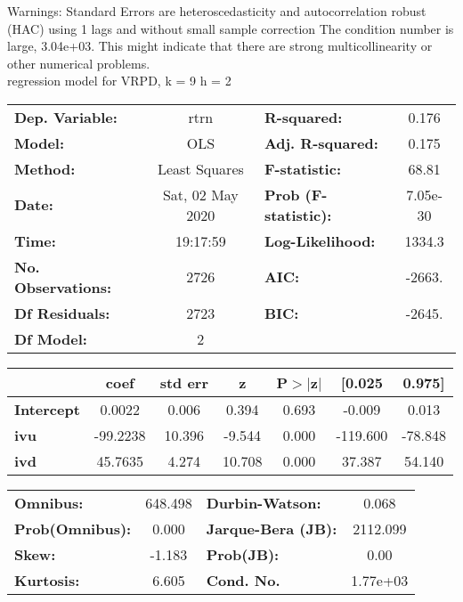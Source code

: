 Warnings: \newline
 [1] Standard Errors are heteroscedasticity and autocorrelation robust (HAC) using 1 lags and without small sample correction \newline
 [2] The condition number is large, 3.04e+03. This might indicate that there are \newline
 strong multicollinearity or other numerical problems.\\ 

regression model for VRPD, k = 9 h = 2\begin{center}
\begin{tabular}{lclc}
\toprule
\textbf{Dep. Variable:}    &       rtrn       & \textbf{  R-squared:         } &     0.176   \\
\textbf{Model:}            &       OLS        & \textbf{  Adj. R-squared:    } &     0.175   \\
\textbf{Method:}           &  Least Squares   & \textbf{  F-statistic:       } &     68.81   \\
\textbf{Date:}             & Sat, 02 May 2020 & \textbf{  Prob (F-statistic):} &  7.05e-30   \\
\textbf{Time:}             &     19:17:59     & \textbf{  Log-Likelihood:    } &    1334.3   \\
\textbf{No. Observations:} &        2726      & \textbf{  AIC:               } &    -2663.   \\
\textbf{Df Residuals:}     &        2723      & \textbf{  BIC:               } &    -2645.   \\
\textbf{Df Model:}         &           2      & \textbf{                     } &             \\
\bottomrule
\end{tabular}
\begin{tabular}{lcccccc}
                   & \textbf{coef} & \textbf{std err} & \textbf{z} & \textbf{P$> |$z$|$} & \textbf{[0.025} & \textbf{0.975]}  \\
\midrule
\textbf{Intercept} &       0.0022  &        0.006     &     0.394  &         0.693        &       -0.009    &        0.013     \\
\textbf{ivu}       &     -99.2238  &       10.396     &    -9.544  &         0.000        &     -119.600    &      -78.848     \\
\textbf{ivd}       &      45.7635  &        4.274     &    10.708  &         0.000        &       37.387    &       54.140     \\
\bottomrule
\end{tabular}
\begin{tabular}{lclc}
\textbf{Omnibus:}       & 648.498 & \textbf{  Durbin-Watson:     } &    0.068  \\
\textbf{Prob(Omnibus):} &   0.000 & \textbf{  Jarque-Bera (JB):  } & 2112.099  \\
\textbf{Skew:}          &  -1.183 & \textbf{  Prob(JB):          } &     0.00  \\
\textbf{Kurtosis:}      &   6.605 & \textbf{  Cond. No.          } & 1.77e+03  \\
\bottomrule
\end{tabular}
\end{center}


